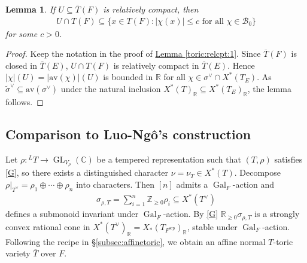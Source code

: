 \documentclass[10pt]{amsart}
\newtheorem{lemma}[theorem]{Lemma}
\theoremstyle{definition}
\numberwithin{equation}{section}
\DeclareMathOperator{\GL}{\mathrm{GL}}
\DeclareMathOperator{\Gal}{\mathrm{Gal}}
\numberwithin{equation}{subsection}
\newcommand{\RR}{\mathbb{R}}
\begin{document}
\begin{lemma}\label{toric:relcpt:2} If $U\subseteq \overline{T}(F)$ is relatively compact, then 
\begin{align*}
    U\cap T(F)\subseteq \{x\in T(F): |\chi(x)|\leq c\text{ for all }\chi\in \mathcal{B}_0\}
\end{align*}
for some $c>0$.
\end{lemma}
\begin{proof} Keep the notation in the proof of \hyperref[toric:relcpt:1]{Lemma \ref{toric:relcpt:1}}. Since $\overline{T}(F)$ is closed in $\overline{T}(E)$, $U\cap T(F)$ is relatively compact in $\overline{T}(E)$. Hence $|\chi|(U) = |\mathrm{av}(\chi)|(U)$ is bounded in $\mathbb{R}$ for all $\chi\in\sigma^\vee\cap X^*(T_E)$. As $\widetilde{\sigma}^\vee\subseteq\mathrm{av}(\sigma^\vee)$ under the natural inclusion $X^*(T)_\RR\subseteq X^*(T_E)_\RR$, the lemma follows.
\end{proof}



\subsection{Comparison to Luo-Ng\^o's construction} \label{subsec:LN}
Let $\rho:{}^LT\to \GL_{V_\rho}(\mathbb{C})$ be a tempered representation such that $(T,\rho)$ satisfies \eqref{G}, so there exists a distinguished character $\nu = \nu_T\in X^*(T)$. Decompose $\rho\vert_{T^\vee} = \rho_1\oplus\cdots\oplus \rho_n$ into characters. Then $[n]$ admits a $\Gal_F$-action and
\begin{align*}
    \sigma_{\rho,T} = \sum_{i=1}^n \mathbb{Z}_{\geq 0}\rho_i \subseteq X^*(T^\vee)
\end{align*}
defines a submonoid invariant under $\Gal_F$-action. By \eqref{G} $\mathbb{R}_{\geq 0}\sigma_{\rho,T}$ is a strongly convex rational cone in $X^*(T^\vee)_{\mathbb{R}} = X_*(T_{F^{\mathrm{sep}}})_{\mathbb{R}}$, stable under $\Gal_F$-action. Following the recipe in \S\ref{subsec:affinetoric}, we obtain an affine normal $T$-toric variety $\overline{T}$ over $F$.
\end{document}

